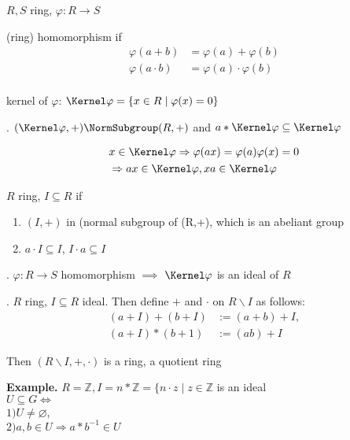 \begin{definition}
  $R,S$ ring, $\varphi : R \rightarrow S$

  (ring) homomorphism if 
  \begin{align*}
    \varphi(a+b) &= \varphi(a) + \varphi(b)\\
    \varphi(a \cdot b) &= \varphi(a) \cdot \varphi(b)\\
  \end{align*}

  kernel of $\varphi$: $\Kernel \varphi = \{ x \in R \mid \varphi(x) = 0\}$
\end{definition}

\Theorem.
$(\Kernel \varphi, +) \NormSubgroup (R, +)$
and 
$a * \Kernel \varphi \subseteq \Kernel \varphi$

\begin{align*}
  &x \in \Kernel \varphi \Rightarrow \varphi(ax) = \varphi(a) \varphi(x) = 0 \\
  & \Rightarrow a x \in \Kernel \varphi, x a \in \Kernel \varphi
\end{align*}

\begin{definition}
  $R$ ring, $I \subseteq R$  if
  \begin{enumerate}
    \item $(I, +)$ in (normal subgroup of (R,+), which is an abeliant group
    \item $a \cdot I \subseteq I$, $I \cdot a \subseteq I$
  \end{enumerate}
\end{definition}

\Remark.
$\varphi: R \rightarrow S$ homomorphism $\implies$ $\Kernel \varphi$ is an ideal of $R$

\Theorem. 
$R$ ring, $ I \subseteq R$ ideal. Then define $+$ and $\cdot$ on $R\backslash I$ as follows:
\begin{align*}
  (a+I) + (b+I) &:= (a+b)+I, \\
  (a+I)*(b+1) &:= (ab) + I
\end{align*}

Then $(R\backslash I, +, \cdot)$ is a ring, a quotient ring

\textbf{Example.}
$R = \mathbb{Z}, I = n*\mathbb{Z} = \{n \cdot z \mid z \in \mathbb{Z}$ is an ideal \\
$U \subseteq G \Leftrightarrow$ \\
  $1) U \neq \varnothing$, \\
  $2) a,b \in U \Rightarrow a*b^{-1} \in U$

